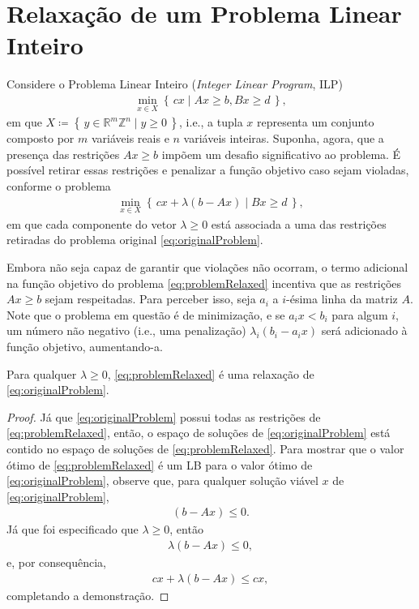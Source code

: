 { 
\color{black}

\section{Relaxação de um Problema Linear Inteiro}

Considere o Problema Linear Inteiro (\textit{Integer Linear Program}, ILP) 
\begin{align*}
	\min_{x \in X} \left\{\, cx \mid Ax \geq b, Bx \geq d \,\right\}, \tag{P}\label{eq:originalProblem}
\end{align*}
em que \(X \coloneqq \left\{ \, y \in \mathbb{R}^{m} \mathbb{Z}^{n} \mid y \geq 0 \, \right\}\), i.e., a tupla $x$ representa um conjunto composto por $m$ variáveis reais e $n$ variáveis inteiras. Suponha, agora, que a presença das restrições $Ax \geq b$ impõem um desafio significativo ao problema. É possível retirar essas restrições e penalizar a função objetivo caso sejam violadas, conforme o problema
\begin{align*}
	\min_{x \in X} \left\{\, cx + \lambda (b - Ax) \mid Bx \geq d \,\right\} \tag{PR$_\lambda$}\label{eq:problemRelaxed},
\end{align*}
em que cada componente do vetor $\lambda \geq 0$ está associada a uma das restrições retiradas do problema original \eqref{eq:originalProblem}.

Embora não seja capaz de garantir que violações não ocorram, o termo adicional na função objetivo do problema \eqref{eq:problemRelaxed} incentiva que as restrições $Ax \geq b$ sejam respeitadas. Para perceber isso, seja $a_i$ a $i$-ésima linha da matriz $A$. Note que o problema em questão é de minimização, e se $a_i x < b_i$ para algum $i$, um número não negativo (i.e., uma penalização) $\lambda_i (b_i - a_i x)$ será adicionado à função objetivo, aumentando-a. 

\begin{theorem}
	\label{thm:relaxLB}
	Para qualquer $\lambda \geq 0$, \eqref{eq:problemRelaxed} é uma relaxação de \eqref{eq:originalProblem}.
\end{theorem}
\begin{proof}
	Já que \eqref{eq:originalProblem} possui todas as restrições de \eqref{eq:problemRelaxed}, então, o espaço de soluções de \eqref{eq:originalProblem} está contido no espaço de soluções de \eqref{eq:problemRelaxed}. Para mostrar que o valor ótimo de \eqref{eq:problemRelaxed} é um LB para o valor ótimo de \eqref{eq:originalProblem}, observe que, para qualquer solução viável $x$ de \eqref{eq:originalProblem}, 
	\begin{align*}
		(b - Ax) \leq 0.
	\end{align*}
	Já que foi especificado que $\lambda \geq 0$, então
	\begin{align*}
		\lambda (b - Ax) \leq 0,
	\end{align*}
	e, por consequência,
	\begin{align*}
		cx + \lambda (b - Ax) \leq cx,
	\end{align*}
	completando a demonstração.
\end{proof}

}
